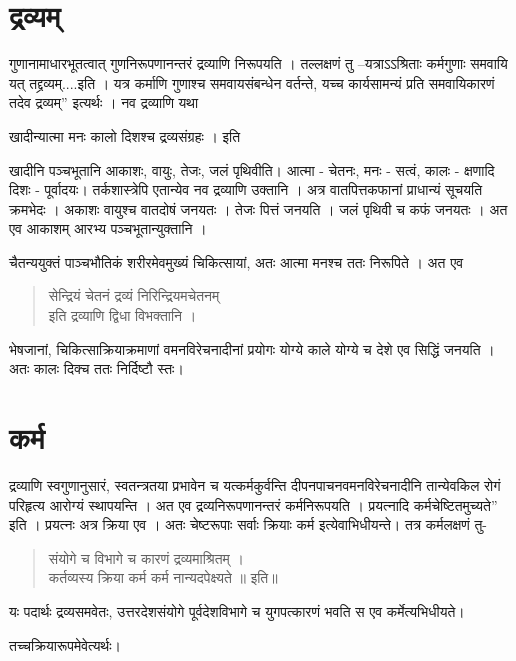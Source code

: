 \section*{द्रव्यम्}

गुणानामाधारभूतत्वात् गुणनिरूपणानन्तरं द्रव्याणि निरूपयति । तल्लक्षणं तु –यत्राऽऽश्रिताः कर्मगुणाः समवायि यत् तद्द्रव्यम्....इति । यत्र कर्माणि गुणाश्च समवायसंबन्धेन वर्तन्ते, यच्च कार्यसामन्यं प्रति समवायिकारणं तदेव द्रव्यम्” इत्यर्थः । नव द्रव्याणि यथा \

खादीन्यात्मा मनः कालो दिशश्च द्रव्यसंग्रहः । इति

खादीनि पञ्चभूतानि  आकाशः, वायुः, तेजः, जलं पृथिवीति। आत्मा - चेतनः, मनः - सत्वं, कालः - क्षणादि दिशः - पूर्वादयः। तर्कशास्त्रेपि एतान्येव नव द्रव्याणि उक्तानि । अत्र वातपित्तकफानां प्राधान्यं सूचयति क्रमभेदः । अकाशः वायुश्च वातदोषं जनयतः । तेजः पित्तं जनयति । जलं पृथिवी च कफं जनयतः । अत एव आकाशम् आरभ्य पञ्चभूतान्युक्तानि ।

चैतन्ययुक्तं पाञ्चभौतिकं शरीरमेवमुख्यं चिकित्सायां, अतः आत्मा मनश्च ततः निरूपिते । अत एव
\begin{verse}
सेन्द्रियं चेतनं द्रव्यं निरिन्द्रियमचेतनम्\\
इति द्रव्याणि द्विधा विभक्तानि ।
\end{verse}
भेषजानां, चिकित्साक्रियाक्रमाणां वमनविरेचनादीनां प्रयोगः योग्ये काले योग्ये च देशे एव सिद्धिं जनयति । अतः कालः दिक्च ततः निर्दिष्टौ स्तः।

\section*{कर्म} 

द्रव्याणि स्वगुणानुसारं, स्वतन्त्रतया प्रभावेन च यत्कर्मकुर्वन्ति दीपनपाचनवमनविरेचनादीनि तान्येवकिल रोगं परिहृत्य आरोग्यं स्थापयन्ति । अत एव द्रव्यनिरूपणानन्तरं कर्मनिरूपयति । प्रयत्नादि कर्मचेष्टितमुच्यते” इति । प्रयत्नः अत्र क्रिया एव । अतः चेष्टरूपाः सर्वाः क्रियाः कर्म इत्येवाभिधीयन्ते। तत्र कर्मलक्षणं तु-
\begin{verse}
संयोगे च विभागे च कारणं द्रव्यमाश्रितम् ।\\
कर्तव्यस्य क्रिया कर्म कर्म नान्यदपेक्ष्यते ॥ इति॥
\end{verse}
यः पदार्थः द्रव्यसमवेतः, उत्तरदेशसंयोगे पूर्वदेशविभागे च युगपत्कारणं भवति स एव कर्मेत्यभिधीयते।

तच्चक्रियारूपमेवेत्यर्थः।

